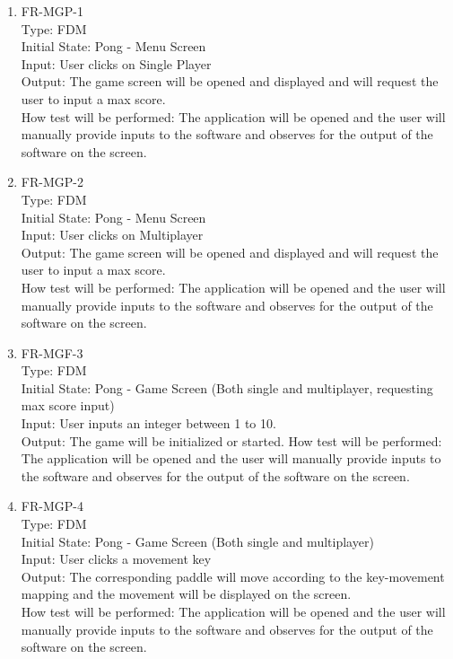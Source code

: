 \documentclass[12pt, titlepage]{article}
\begin{document}
\begin{enumerate}

\item{FR-MGP-1\\}
Type: FDM\\
Initial State: Pong - Menu Screen\\
Input: User clicks on Single Player\\
Output: The game screen will be opened and displayed and will request the user to input a max score.\\
How test will be performed: The application will be opened and the user will manually provide inputs to the software and observes for the output of the software on the screen.\\

\item{FR-MGP-2\\}
Type: FDM\\
Initial State: Pong - Menu Screen\\
Input: User clicks on Multiplayer\\
Output: The game screen will be opened and displayed and will request the user to input a max score.\\
How test will be performed: The application will be opened and the user will manually provide inputs to the software and observes for the output of the software on the screen.\\

\item{FR-MGF-3\\}
Type: FDM\\
Initial State: Pong - Game Screen (Both single and multiplayer, requesting max score input)\\
Input: User inputs an integer between 1 to 10.\\
Output: The game will be initialized or started.
How test will be performed: The application will be opened and the user will manually provide inputs to the software and observes for the output of the software on the screen.\\

\item{FR-MGP-4\\}
Type: FDM\\
Initial State: Pong - Game Screen (Both single and multiplayer)\\
Input: User clicks a movement key\\
Output: The corresponding paddle will move according to the key-movement mapping and the movement will be displayed on the screen.\\
How test will be performed: The application will be opened and the user will manually provide inputs to the software and observes for the output of the software on the screen.\\


\end{enumerate}
\end{document}
